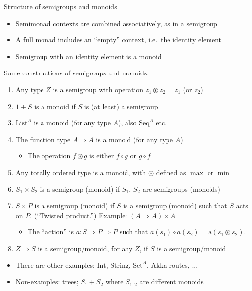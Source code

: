 \documentclass[english]{beamer}
\begin{document}
\begin{frame}{Structure of semigroups and monoids}

\begin{itemize}
\item Semimonad contexts are combined associatively, as in a semigroup
\item A full monad includes an ``empty'' context, i.e.\ the identity
element
\item Semigroup with an identity element is a monoid
\end{itemize}
Some constructions of semigroups and monoids:
\begin{enumerate}
\item Any type $Z$ is a semigroup with operation $z_{1}\circledast z_{2}=z_{1}$
(or $z_{2}$)
\item $1+S$ is a monoid if $S$ is (at least) a semigroup
\item $\text{List}^{A}$ is a monoid (for any type $A$), also $\text{Seq}^{A}$
etc.
\item The function type $A\Rightarrow A$ is a monoid (for any type $A$)
\begin{itemize}
\item The operation $f\circledast g$ is either $f\circ g$ or $g\circ f$
\end{itemize}
\item Any totally ordered type is a monoid, with $\circledast$ defined
as $\max$ or $\min$
\item $S_{1}\times S_{2}$ is a semigroup (monoid) if $S_{1}$, $S_{2}$
are semigroups (monoids)
\item $S\times P$ is a semigroup (monoid) if $S$ is a semigroup (monoid)
such that $S$ acts on $P$. (``Twisted product.'') Example: $\left(A\Rightarrow A\right)\times A$
\begin{itemize}
\item The ``action'' is $a:S\Rightarrow P\Rightarrow P$ such that $a(s_{1})\circ a(s_{2})=a(s_{1}\circledast s_{2})$.
\end{itemize}
\item $Z\Rightarrow S$ is a semigroup/monoid, for any $Z$, if $S$ is
a semigroup/monoid
\end{enumerate}
\begin{itemize}
\item There are other examples: $\text{Int}$, $\text{String}$, $\text{Set}^{A}$,
Akka routes, ...
\item Non-examples: trees; $S_{1}+S_{2}$ where $S_{1,2}$ are different
monoids
\end{itemize}
\end{frame}
\end{document}
